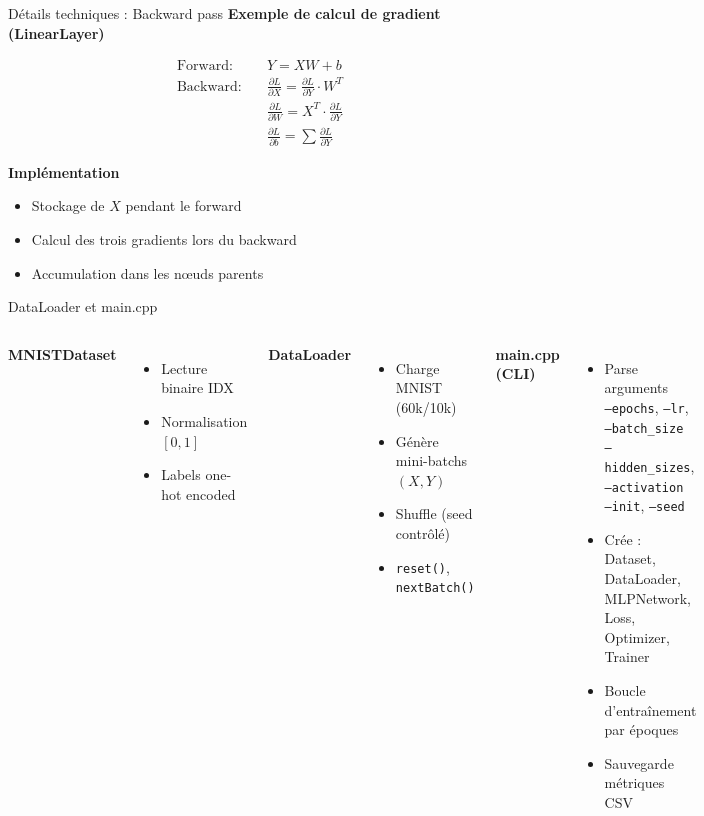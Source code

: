 \documentclass[aspectratio=169,xcolor=dvipsnames]{beamer}
\begin{document}
\begin{frame}{Détails techniques : Backward pass}
\textbf{Exemple de calcul de gradient (LinearLayer)}

\begin{align*}
\text{Forward:} \quad & Y = XW + b \\
\text{Backward:} \quad & \frac{\partial L}{\partial X} = \frac{\partial L}{\partial Y} \cdot W^T \\
& \frac{\partial L}{\partial W} = X^T \cdot \frac{\partial L}{\partial Y} \\
& \frac{\partial L}{\partial b} = \sum \frac{\partial L}{\partial Y}
\end{align*}

\vspace{0.5cm}

\textbf{Implémentation}
\begin{itemize}
    \item Stockage de $X$ pendant le forward
    \item Calcul des trois gradients lors du backward
    \item Accumulation dans les nœuds parents
\end{itemize}
\end{frame}

\begin{frame}{DataLoader et main.cpp}
\begin{columns}[T]
{\small
\textbf{MNISTDataset}
\begin{itemize}
    \item Lecture binaire IDX
    \item Normalisation $[0,1]$
    \item Labels one-hot encoded
\end{itemize}

\vspace{0.2cm}
\textbf{DataLoader}
\begin{itemize}
    \item Charge MNIST (60k/10k)
    \item Génère mini-batchs $(X, Y)$
    \item Shuffle (seed contrôlé)
    \item \texttt{reset()}, \texttt{nextBatch()}
\end{itemize}
}

{\small
\textbf{main.cpp (CLI)}
\begin{itemize}
    \item Parse arguments\\
    \texttt{--epochs}, \texttt{--lr}, \texttt{--batch\_size}\\
    \texttt{--hidden\_sizes}, \texttt{--activation}\\
    \texttt{--init}, \texttt{--seed}
    \item Crée : Dataset, DataLoader,\\
    MLPNetwork, Loss, Optimizer, Trainer
    \item Boucle d'entraînement par époques
    \item Sauvegarde métriques CSV
\end{itemize}
}
\end{columns}
\end{frame}
\end{document}
